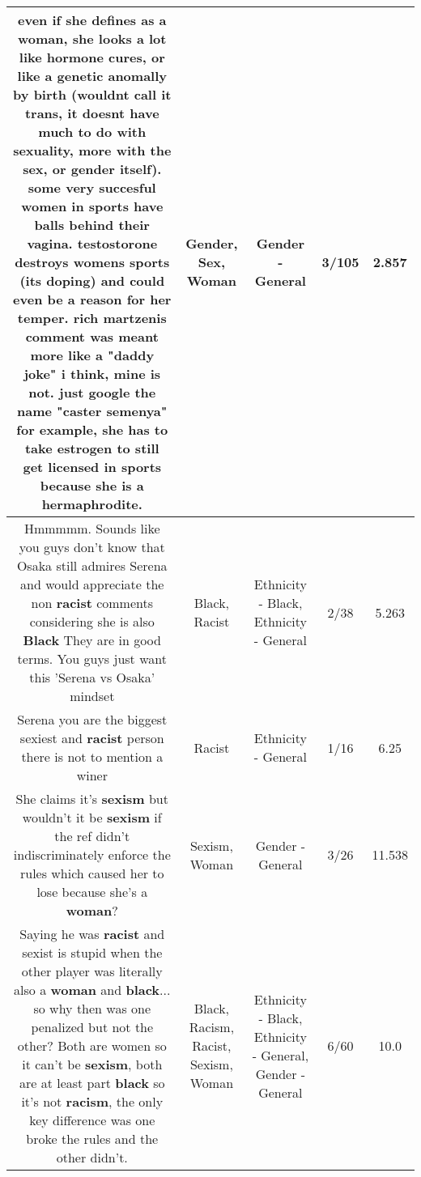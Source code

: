 \documentclass[11pt]{article}
\newlength\mylength
\begin{document}
\begin{center}
\begin{longtable}{|C{.65\mylength}|C{.30\mylength}|C{.12\mylength}|C{.12\mylength}|C{.12\mylength}|}
  \small even if she defines as a \textbf{woman}, she looks a lot like hormone cures, or like a genetic anomally by birth (wouldnt call it trans, it doesnt have much to do with sexuality, more with the \textbf{sex}, or \textbf{gender} itself). some very succesful women in sports have balls behind their vagina. testostorone destroys womens sports (its doping) and could even be a reason for her temper. rich martzenis comment was meant more like a "daddy joke" i think, mine is not. just google the name "caster semenya" for example, she has to take estrogen to still get licensed in sports because she is a hermaphrodite.\normalsize   & Gender, Sex, Woman & Gender - General & 3/105 & 2.857 \\  \hline
  \small Hmmmmm. Sounds like you guys don't know that Osaka still admires Serena and would appreciate the non \textbf{racist} comments considering she is also \textbf{Black} They are in good terms. You guys just want this 'Serena vs Osaka' mindset\normalsize   & Black, Racist & Ethnicity - Black, Ethnicity - General & 2/38 & 5.263 \\  \hline
  \small Serena you are the biggest sexiest and \textbf{racist} person there is not to mention a winer\normalsize   & Racist & Ethnicity - General & 1/16 & 6.25 \\  \hline
  \small She claims it's \textbf{sexism} but wouldn't it be \textbf{sexism} if the ref didn't indiscriminately enforce the rules which caused her to lose because she's a \textbf{woman}?\normalsize   & Sexism, Woman & Gender - General & 3/26 & 11.538 \\  \hline
  \small Saying he was \textbf{racist} and sexist is stupid when the other player was literally also a \textbf{woman} and \textbf{black}... so why then was one penalized but not the other? Both are women so it can't be \textbf{sexism}, both are at least part \textbf{black} so it's not \textbf{racism}, the only key difference was one broke the rules and the other didn't.\normalsize   & Black, Racism, Racist, Sexism, Woman & Ethnicity - Black, Ethnicity - General, Gender - General & 6/60 & 10.0 \\  \hline

\end{longtable}
\end{center}
\end{document}

